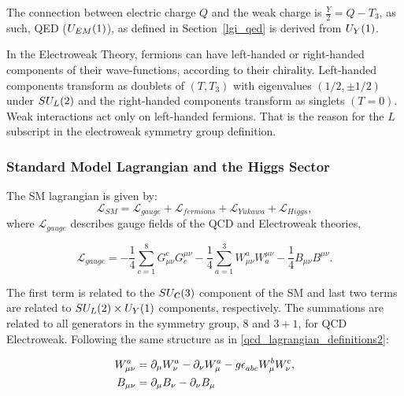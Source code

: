 The connection between electric charge $Q$ and the weak charge is $\frac{Y}{2} = Q - T_3$, as such, QED ($U_{\scaleto{EM}{5pt}}(1)$), as defined in Section~\ref{lgi_qed} is derived from $U_{\scaleto{Y}{5pt}}(1)$.

In the Electroweak Theory, fermions can have left-handed or right-handed components of their wave-functions, according to their chirality. Left-handed components transform as doublets of $(T, T_3)$ with eigenvalues $(1/2, \pm1/2)$ under $SU_{\scaleto{L}{5pt}}(2)$ and the right-handed components transform as singlets $(T=0)$. Weak interactions act only on left-handed fermions. That is the reason for the $L$ subscript in the electroweak symmetry group definition.

\subsubsection{Standard Model Lagrangian and the Higgs Sector}

The SM lagrangian is given by:
\begin{equation}
        \mathcal{L}_{SM} =  \mathcal{L}_{gauge} + \mathcal{L}_{fermions} + \mathcal{L}_{Yukawa} + \mathcal{L}_{Higgs},
\label{sm_lagrangian}
\end{equation}
where $\mathcal{L}_{gauge}$ describes gauge fields of the QCD and Electroweak theories,

\begin{equation}
    \mathcal{L}_{gauge} =  -\frac{1}{4}\sum_{c = 1}^{8}G_{\mu\nu}^c G^{\mu\nu}_c -\frac{1}{4}\sum_{a = 1}^{3}W_{\mu\nu}^a W^{\mu\nu}_a  -\frac{1}{4}B_{\mu\nu} B^{\mu\nu} .
\label{sm_lagrangian_gauge}
\end{equation} 

The first term is related to the $SU_{\scaleto{c}{5pt}}(3)$ component of the SM and last two terms are related to $SU_{\scaleto{L}{5pt}}(2) \times U_{\scaleto{Y}{5pt}}(1)$ components, respectively. The summations are related to all generators in the symmetry group, $8$ and $3 + 1$, for QCD Electroweak.  Following the same structure as in \ref{qcd_lagrangian_definitions2}:

\begin{equation}
    \begin{split}
        W_{\mu\nu}^a &= \partial_\mu W_\nu^a - \partial_\nu W_\mu^a - g \levicivita{_{abc}} W_\mu^b W_\nu^c,  \\
        B_{\mu\nu} &= \partial_\mu B_\nu - \partial_\nu B_\mu
    \end{split}
\label{electroweak_field}
\end{equation}


